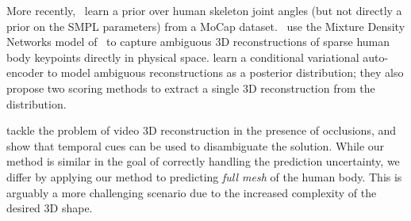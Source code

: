 More recently,~\citet{akhter15pose-conditioned} learn a prior over human skeleton joint angles (but not directly a prior on the SMPL parameters) from a MoCap dataset.~\citet{li19generating} use the Mixture Density Networks model of~\cite{bishop94mixture} to capture ambiguous 3D reconstructions of sparse human body keypoints directly in physical space.
\citet{sharma19monocular} learn a conditional variational auto-encoder to model ambiguous reconstructions as a posterior distribution; they also propose two scoring methods to extract a single 3D reconstruction from the distribution.


\citet{cheng19occlusion-aware} tackle the problem of video 3D reconstruction in the presence of occlusions, and show that temporal cues can be used to disambiguate the solution.
While our method is similar in the goal of correctly handling the prediction uncertainty, we differ by applying our method to predicting \emph{full mesh} of the human body.
This is arguably a more challenging scenario due to the increased complexity of the desired 3D shape.


